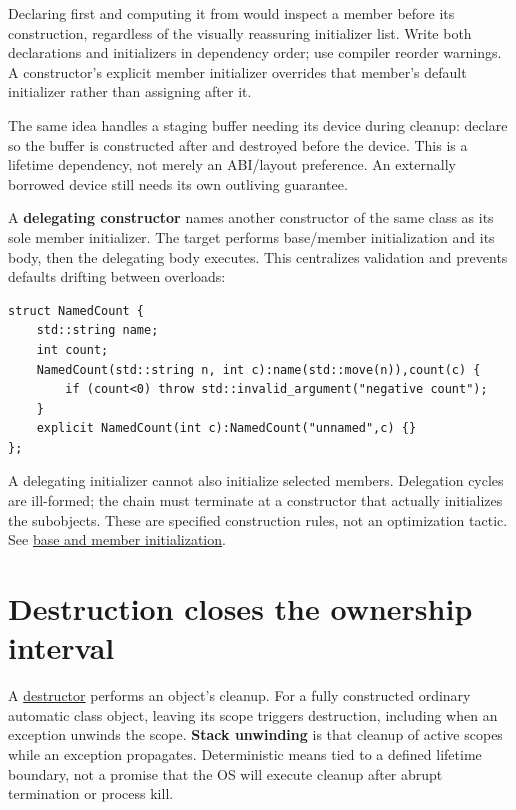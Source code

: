 Declaring  first and computing it from  would inspect a member before its construction, regardless of the visually reassuring initializer list. Write both declarations and initializers in dependency order; use compiler reorder warnings. A constructor's explicit member initializer overrides that member's default initializer rather than assigning after it.

The same idea handles a staging buffer needing its device during cleanup: declare  so the buffer is constructed after and destroyed before the device. This is a lifetime dependency, not merely an ABI/layout preference. An externally borrowed device still needs its own outliving guarantee.

A \textbf{delegating constructor} names another constructor of the same class as its sole member initializer. The target performs base/member initialization and its body, then the delegating body executes. This centralizes validation and prevents defaults drifting between overloads:

\begin{verbatim}
struct NamedCount {
    std::string name;
    int count;
    NamedCount(std::string n, int c):name(std::move(n)),count(c) {
        if (count<0) throw std::invalid_argument("negative count");
    }
    explicit NamedCount(int c):NamedCount("unnamed",c) {}
};
\end{verbatim}

A delegating initializer cannot also initialize selected members. Delegation cycles are ill-formed; the chain must terminate at a constructor that actually initializes the subobjects. These are specified construction rules, not an optimization tactic. See \href{https://eel.is/c++draft/class.base.init}{base and member initialization}.

\section{Destruction closes the ownership interval}\label{01-foundations-i-ch003-destruction-closes-the-ownership-interval}

\hypertarget{01-foundations-i-ch003-destruction-closes-the-ownership-interval}{}

A \hyperref[appendix-9bfe377cef7a]{destructor} performs an object's cleanup. For a fully constructed ordinary automatic class object, leaving its scope triggers destruction, including when an exception unwinds the scope. \textbf{Stack unwinding} is that cleanup of active scopes while an exception propagates. Deterministic means tied to a defined lifetime boundary, not a promise that the OS will execute cleanup after abrupt termination or process kill.

